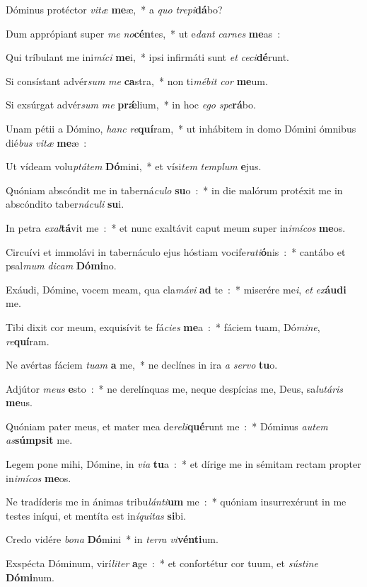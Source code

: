 ﻿\item Dóminus protéctor \emph{vi}\emph{tæ} \textbf{me}æ,~* a \emph{quo} \emph{tre}\emph{pi}\textbf{dá}bo?
\item Dum apprópiant super \emph{me} \emph{no}\textbf{cén}tes,~* ut e\emph{dant} \emph{car}\emph{nes} \textbf{me}as~:
\item Qui tríbulant me ini\emph{mí}\emph{ci} \textbf{me}i,~* ipsi infirmáti sunt \emph{et} \emph{ce}\emph{ci}\textbf{dé}runt.
\item Si consístant advér\emph{sum} \emph{me} \textbf{ca}stra,~* non ti\emph{mé}\emph{bit} \emph{cor} \textbf{me}um.
\item Si exsúrgat advér\emph{sum} \emph{me} \textbf{prǽ}lium,~* in hoc \emph{e}\emph{go} \emph{spe}\textbf{rá}bo.
\item Unam pétii a Dómino, \emph{hanc} \emph{re}\textbf{quí}ram,~* ut inhábitem in domo Dómini ómnibus dié\emph{bus} \emph{vi}\emph{tæ} \textbf{me}æ~:
\item Ut vídeam volu\emph{ptá}\emph{tem} \textbf{Dó}mini,~* et vísi\emph{tem} \emph{tem}\emph{plum} \textbf{e}jus.
\item Quóniam abscóndit me in taberná\emph{cu}\emph{lo} \textbf{su}o~:~* in die malórum protéxit me in abscóndito taber\emph{ná}\emph{cu}\emph{li} \textbf{su}i.
\item In petra \emph{ex}\emph{al}\textbf{tá}vit me~:~* et nunc exaltávit caput meum super in\emph{i}\emph{mí}\emph{cos} \textbf{me}os.
\item Circuívi et immolávi in tabernáculo ejus hóstiam vocife\emph{ra}\emph{ti}\textbf{ó}nis~:~* cantábo et psal\emph{mum} \emph{di}\emph{cam} \textbf{Dó}\textbf{mi}no.
\item Exáudi, Dómine, vocem meam, qua cla\emph{má}\emph{vi} \textbf{ad} te~:~* miserére me\emph{i}, \emph{et} \emph{ex}\textbf{áu}\textbf{di} me.
\item Tibi dixit cor meum, exquisívit te fá\emph{ci}\emph{es} \textbf{me}a~:~* fáciem tuam, Dó\emph{mi}\emph{ne}, \emph{re}\textbf{quí}ram.
\item Ne avértas fáciem \emph{tu}\emph{am} \textbf{a} me,~* ne declínes in ira \emph{a} \emph{ser}\emph{vo} \textbf{tu}o.
\item Adjútor \emph{me}\emph{us} \textbf{e}sto~:~* ne derelínquas me, neque despícias me, Deus, sa\emph{lu}\emph{tá}\emph{ris} \textbf{me}us.
\item Quóniam pater meus, et mater mea de\emph{re}\emph{li}\textbf{qué}runt me~:~* Dóminus \emph{au}\emph{tem} \emph{as}\textbf{súm}\textbf{psit} me.
\item Legem pone mihi, Dómine, in \emph{vi}\emph{a} \textbf{tu}a~:~* et dírige me in sémitam rectam propter in\emph{i}\emph{mí}\emph{cos} \textbf{me}os.
\item Ne tradíderis me in ánimas tribu\emph{lán}\emph{ti}\textbf{um} me~:~* quóniam insurrexérunt in me testes iníqui, et mentíta est in\emph{í}\emph{qui}\emph{tas} \textbf{si}bi.
\item Credo vidére \emph{bo}\emph{na} \textbf{Dó}mini~* in \emph{ter}\emph{ra} \emph{vi}\textbf{vén}\textbf{ti}um.
\item Exspécta Dóminum, virí\emph{li}\emph{ter} \textbf{a}ge~:~* et confortétur cor tuum, et \emph{sús}\emph{ti}\emph{ne} \textbf{Dó}\textbf{mi}num.